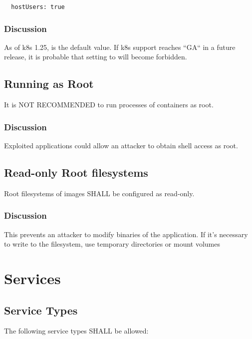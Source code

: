 \documentclass[PMO,authoryear,toc]{lsstdoc}
\begin{document}
\begin{verbatim}
  hostUsers: true
\end{verbatim}

\subsubsection{Discussion}

As of k8s 1.25,  is the default value.
If k8s  support reaches ``GA`` in a future release, it is probable that setting  to  will become forbidden.


\subsection{Running as Root}\label{sec:nonroot}

It is NOT RECOMMENDED to run processes of containers as root. 

\subsubsection{Discussion}

Exploited applications could allow an attacker to obtain shell access as root. 

\subsection{Read-only Root filesystems}\label{sec:roroot}

Root filesystems of images SHALL be configured as read-only.

\subsubsection{Discussion}

This prevents an attacker to modify binaries of the application. If it's necessary to write to the filesystem, use temporary directories or mount volumes

\section{Services}\label{sec:svc}

\subsection{Service Types}

The following service types SHALL be allowed:
\end{document}
